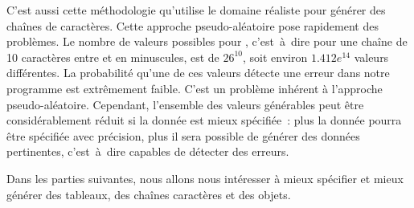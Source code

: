 C'est aussi cette méthodologie qu'utilise le domaine réaliste  pour
générer des chaînes de caractères. Cette approche pseudo-aléatoire pose
rapidement des problèmes. Le nombre de valeurs possibles pour , c'est~à~dire pour une chaîne de 10 caractères entre  et
 en minuscules, est de $26^{10}$, soit environ $1.412e^{14}$ valeurs
différentes. La probabilité qu'une de ces valeurs détecte une erreur dans notre
programme est extrêmement faible. C'est un problème inhérent à l'approche
pseudo-aléatoire. Cependant, l'ensemble des valeurs générables peut être
considérablement réduit si la donnée est mieux spécifiée~: plus la donnée pourra
être spécifiée avec précision, plus il sera possible de générer des données
pertinentes, c'est~à~dire capables de détecter des erreurs.

Dans les parties suivantes, nous allons nous intéresser à mieux spécifier et
mieux générer des tableaux, des chaînes caractères et des objets.
